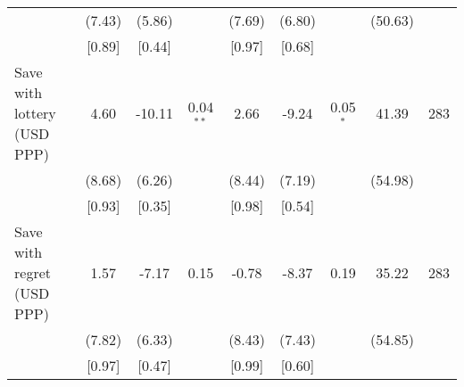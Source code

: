 \begin{table}[h]
{\begin{threeparttable}
\begin{tabular}{l*{8}{c}}
          &   (7.43)&   (5.86)&         &   (7.69)&   (6.80)&         &  (50.63)&         \\
          &   [0.89]&   [0.44]&         &   [0.97]&   [0.68]&         &         &         \\
Save with lottery (USD PPP)&     4.60&   -10.11&0.04$^{**}$&     2.66&    -9.24&0.05$^{*}$&    41.39&      283\\
          &   (8.68)&   (6.26)&         &   (8.44)&   (7.19)&         &  (54.98)&         \\
          &   [0.93]&   [0.35]&         &   [0.98]&   [0.54]&         &         &         \\
Save with regret (USD PPP)&     1.57&    -7.17&     0.15&    -0.78&    -8.37&     0.19&    35.22&      283\\
          &   (7.82)&   (6.33)&         &   (8.43)&   (7.43)&         &  (54.85)&         \\
          &   [0.97]&   [0.47]&         &   [0.99]&   [0.60]&         &         &         \\
\bottomrule \end{tabular} \begin{tablenotes}[flushleft] \footnotesize \item  \end{tablenotes} \end{threeparttable} } \end{table}
